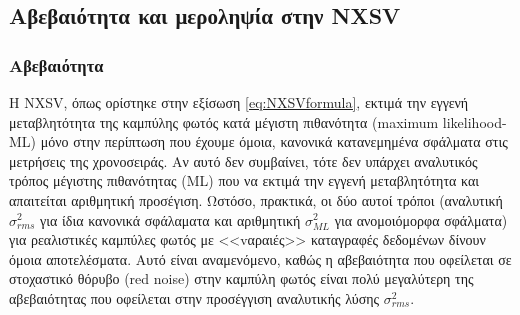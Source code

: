 
\subsection{Αβεβαιότητα και μεροληψία στην \textlatin{NXSV}}

\subsubsection*{Αβεβαιότητα}
Η \textlatin{NXSV}, όπως ορίστηκε στην εξίσωση \ref{eq:NXSVformula}, εκτιμά την εγγενή μεταβλητότητα της καμπύλης φωτός κατά μέγιστη πιθανότητα \textlatin{(maximum likelihood- ML)} μόνο στην περίπτωση που έχουμε όμοια, κανονικά κατανεμημένα σφάλματα στις μετρήσεις της χρονοσειράς. Αν αυτό δεν συμβαίνει, τότε δεν υπάρχει αναλυτικός τρόπος μέγιστης πιθανότητας \textlatin{(ML)} που να εκτιμά την εγγενή μεταβλητότητα και απαιτείται αριθμητική προσέγιση\cite{2017MNRAS.471.4398P}. Ωστόσο, πρακτικά, οι δύο αυτοί τρόποι (αναλυτική $\sigma_{rms}^2$ για ίδια κανονικά σφάλαματα και αριθμητική $\sigma_{ML}^2$ για ανομοιόμορφα σφάλματα) για ρεαλιστικές καμπύλες φωτός με <<vαραιές>> καταγραφές δεδομένων δίνουν όμοια αποτελέσματα\cite{2013ApJ...771....9A}. Αυτό είναι αναμενόμενο, καθώς η αβεβαιότητα που οφείλεται σε στοχαστικό θόρυβο \textlatin{(red noise)} στην καμπύλη φωτός είναι πολύ μεγαλύτερη της αβεβαιότητας που οφείλεται στην προσέγγιση αναλυτικής λύσης $\sigma_{rms}^2$.\\



